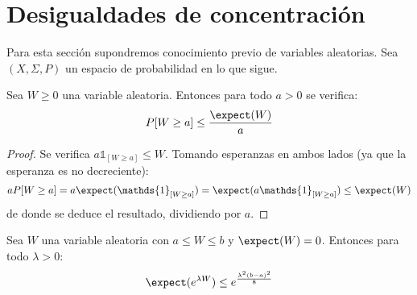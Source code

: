 \section{Desigualdades de concentración}
Para esta sección supondremos conocimiento previo de variables aleatorias. Sea $(X,\Sigma,P)$ un espacio 
de probabilidad en lo que sigue.

\begin{lemma}
Sea $W \ge 0$ una variable aleatoria. Entonces para todo $a > 0$ se verifica:
\[
  P[W \ge a] \le \frac{\expect(W)}{a}
\]
\label{ineq:markov}
\end{lemma}

\begin{proof}
 Se verifica $a\mathds{1}_{[W\ge a]} \le W$. Tomando esperanzas en ambos lados (ya que la esperanza es no 
 decreciente):
 \[
   aP[W\ge a] = a\expect(\mathds{1}_{[W\ge a]}) = \expect(a\mathds{1}_{[W\ge a]}) \le \expect(W)
 \]
 de donde se deduce el resultado, dividiendo por $a$.
\end{proof}

\begin{lemma}
 Sea $W$ una variable aleatoria con $a\le W \le b$ y $\expect(W) = 0$. Entonces para todo $\lambda > 0$:
 \[
   \expect(e^{\lambda W}) \le e^{\frac{\lambda^2(b-a)^2}{8}}
 \]
 
 \label{lemma:hoeffding}
\end{lemma}

